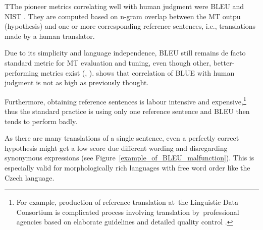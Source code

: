 \documentclass[11pt]{article}
\def\Fref#1{Figure~\ref{#1}}
\begin{document}


TThe pioneer metrics correlating well with human judgment were BLEU \cite{bleu} 
and NIST \cite{nist}. They are computed based on n-gram overlap between the 
MT outpu (hypothesis) and one or more corresponding reference sentences, i.e., 
translations made by a human translator.

Due to its simplicity and language independence, BLEU still remains de facto
standard metric for MT evaluation and tuning, even though other, 
better-performing metrics exist (, ). 
 shows that correlation of BLUE with human judgment is 
not as high as previously thought.


Furthermore, obtaining reference sentences is labour intensive and 
expensive,\footnote{For example, production of reference translation  at~the 
Linguistic Data Consortium is complicated process involving translation 
by~professional agencies based on elaborate guidelines and detailed quality 
control \cite{strassel}.} thus the standard practice is using only one 
reference sentence and BLEU then tends to perform badly. 

As there are many translations of a single sentence, even a perfectly correct 
hypothesis might get a low score due different wording and disregarding 
synonymous expressions (see \Fref{example_of_BLEU_malfunction}). This is 
especially valid for morphologically rich languages with free word order 
like the Czech language. \cite{bojar-tackling-sparse-data}
\end{document}
